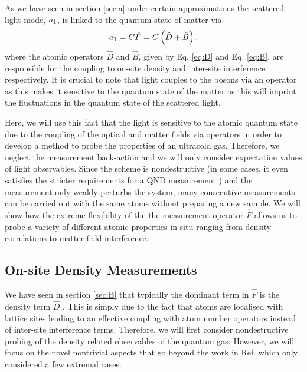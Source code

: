 As we have seen in section \ref{sec:a} under certain approximations
the scattered light mode, $a_1$, is linked to the quantum state of
matter via 
\begin{equation}
  \label{eq:a-3}
  a_1 = C \hat{F} = C \left(\hat{D} + \hat{B} \right),
\end{equation}
where the atomic operators $\hat{D}$ and $\hat{B}$, given by
Eq. \eqref{eq:D} and Eq. \eqref{eq:B}, are responsible for the
coupling to on-site density and inter-site interference
respectively. It is crucial to note that light couples to the bosons
via an operator as this makes it sensitive to the quantum state of the
matter as this will imprint the fluctuations in the quantum state of
the scattered light.

Here, we will use this fact that the light is sensitive to the atomic
quantum state due to the coupling of the optical and matter fields via
operators in order to develop a method to probe the properties of an
ultracold gas. Therefore, we neglect the measurement back-action and
we will only consider expectation values of light observables. Since
the scheme is nondestructive (in some cases, it even satisfies the
stricter requirements for a QND measurement \cite{mekhov2012,
  mekhov2007pra}) and the measurement only weakly perturbs the system,
many consecutive measurements can be carried out with the same atoms
without preparing a new sample. We will show how the extreme
flexibility of the the measurement operator $\hat{F}$ allows us to
probe a variety of different atomic properties in-situ ranging from
density correlations to matter-field interference.

\subsection{On-site Density Measurements}

We have seen in section \ref{sec:B} that typically the dominant term
in $\hat{F}$ is the density term $\hat{D}$ \cite{LP2009,
  mekhov2007pra, rist2010, lakomy2009, ruostekoski2009}. This is
simply due to the fact that atoms are localised with lattice sites
leading to an effective coupling with atom number operators instead of
inter-site interference terms. Therefore, we will first consider
nondestructive probing of the density related observables of the
quantum gas. However, we will focus on the novel nontrivial aspects
that go beyond the work in Ref. \cite{mekhov2012, mekhov2007prl,
  mekhov2007pra} which only considered a few extremal cases.

